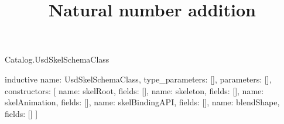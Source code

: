 \begin{lexlean}{Catalog.UsdSkelSchemaClass}
\title{Natural number addition}
\begin{semanticmodule}
inductive{
  name: UsdSkelSchemaClass,
  type_parameters: [],
  parameters: [],
  constructors: [
    {name: skelRoot, fields: []},
    {name: skeleton, fields: []},
    {name: skelAnimation, fields: []},
    {name: skelBindingAPI, fields: []},
    {name: blendShape, fields: []}
  ]
}
\end{semanticmodule}
\end{lexlean}
